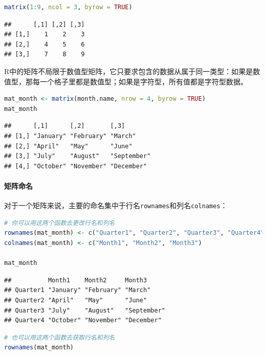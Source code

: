 \documentclass[]{ctexbook}
\let\oldparagraph\paragraph
\renewcommand{\paragraph}[1]{\oldparagraph{#1}\mbox{}}
\newcommand{\passthrough}[1]{#1}
\begin{document}
\begin{lstlisting}[language=R]
matrix(1:9, ncol = 3, byrow = TRUE)
\end{lstlisting}

\begin{lstlisting}
##      [,1] [,2] [,3]
## [1,]    1    2    3
## [2,]    4    5    6
## [3,]    7    8    9
\end{lstlisting}

R中的矩阵不局限于数值型矩阵，它只要求包含的数据从属于同一类型：如果是数值型，那每一个格子里都是数值型；如果是字符型，所有值都是字符型数据。

\begin{lstlisting}[language=R]
mat_month <- matrix(month.name, nrow = 4, byrow = TRUE)
mat_month
\end{lstlisting}

\begin{lstlisting}
##      [,1]      [,2]       [,3]       
## [1,] "January" "February" "March"    
## [2,] "April"   "May"      "June"     
## [3,] "July"    "August"   "September"
## [4,] "October" "November" "December"
\end{lstlisting}

\hypertarget{ux77e9ux9635ux547dux540d}{%
\paragraph{矩阵命名}\label{ux77e9ux9635ux547dux540d}}

对于一个矩阵来说，主要的命名集中于行名\passthrough{\lstinline!rownames!}和列名\passthrough{\lstinline!colnames!}：

\begin{lstlisting}[language=R]
# 你可以用这两个函数去更改行名和列名
rownames(mat_month) <- c("Quarter1", "Quarter2", "Quarter3", "Quarter4")
colnames(mat_month) <- c("Month1", "Month2", "Month3")

mat_month
\end{lstlisting}

\begin{lstlisting}
##          Month1    Month2     Month3     
## Quarter1 "January" "February" "March"    
## Quarter2 "April"   "May"      "June"     
## Quarter3 "July"    "August"   "September"
## Quarter4 "October" "November" "December"
\end{lstlisting}

\begin{lstlisting}[language=R]
# 也可以用这两个函数去获取行名和列名
rownames(mat_month)  
\end{lstlisting}
\end{document}
